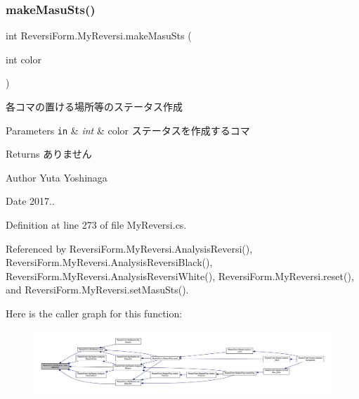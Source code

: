 \subsubsection{\texorpdfstring{make\+Masu\+Sts()}{makeMasuSts()}}
{\footnotesize\ttfamily int Reversi\+Form.\+My\+Reversi.\+make\+Masu\+Sts (\begin{DoxyParamCaption}\item[{int}]{color }\end{DoxyParamCaption})\hspace{0.3cm}{\ttfamily [private]}}



各コマの置ける場所等のステータス作成 


\begin{DoxyParams}[1]{Parameters}
\mbox{\tt in}  & {\em int} & color ステータスを作成するコマ \\
\hline
\end{DoxyParams}
\begin{DoxyReturn}{Returns}
ありません 
\end{DoxyReturn}
\begin{DoxyAuthor}{Author}
Yuta Yoshinaga 
\end{DoxyAuthor}
\begin{DoxyDate}{Date}
2017.. 
\end{DoxyDate}


Definition at line 273 of file My\+Reversi.\+cs.



Referenced by Reversi\+Form.\+My\+Reversi.\+Analysis\+Reversi(), Reversi\+Form.\+My\+Reversi.\+Analysis\+Reversi\+Black(), Reversi\+Form.\+My\+Reversi.\+Analysis\+Reversi\+White(), Reversi\+Form.\+My\+Reversi.\+reset(), and Reversi\+Form.\+My\+Reversi.\+set\+Masu\+Sts().

Here is the caller graph for this function\+:\nopagebreak
\begin{figure}[H]
\begin{center}
\leavevmode
\includegraphics[width=350pt]{class_reversi_form_1_1_my_reversi_a379ac04ab0e8e9fc819ef3ceeba63e58_icgraph}
\end{center}
\end{figure}
\mbox{\label{class_reversi_form_1_1_my_reversi_aa8d8e839466c63462954080353cd4a9e}} 
